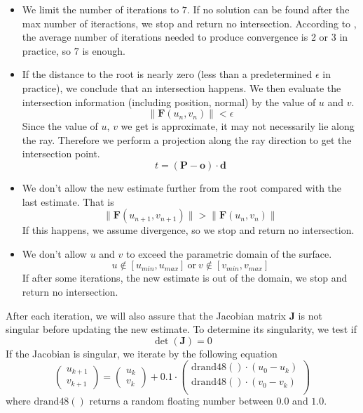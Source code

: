 \documentclass[acmtog]{acmart}
\begin{document}
\begin{itemize}
	\item We limit the number of iterations to $7$. If no solution can be found after the max number of iteractions, we stop and return no intersection. According to \cite{}, the average number of iterations needed to produce convergence is 2 or 3 in practice, so $7$ is enough.
	
	\item If the distance to the root is nearly zero (less than a predetermined $\epsilon$ in practice), we conclude that an intersection happens. We then evaluate the intersection information (including position, normal) by the value of $u$ and $v$.
	\[
		\| \mathbf{F}(u_n, v_n) \| < \epsilon	
	\]
	Since the value of $u$, $v$ we get is approximate, it may not necessarily lie along the ray. Therefore we perform a projection along the ray direction to get the intersection point. \[
		t = (\mathbf{P} - \mathbf{o}) \cdot \mathbf{d}	
	\]

	\item We don't allow the new estimate further from the root compared with the last estimate. That is \[
		\| \mathbf{F}(u_{n+1}, v_{n+1}) \| >
		\| \mathbf{F}(u_{n}, v_{n}) \|
	\] 
	If this happens, we assume divergence, so we stop and return no intersection.

	\item We don't allow $u$ and $v$ to exceed the parametric domain of the surface. \[
		u \notin [u_{min}, u_{max}] \mathrm{\ or\ } v \notin [v_{min}, v_{max}]	
	\]
	If after some iterations, the new estimate is out of the domain, we stop and return no intersection.
\end{itemize}

After each iteration, we will also assure that the Jacobian matrix $\mathbf{J}$ is not singular before updating the new estimate. To determine its singularity, we test if \[
	\det(\mathbf{J}) = 0	
\]
If the Jacobian is singular, we iterate by the following equation
\[
	\left(\begin{matrix}
		u_{k+1}\\v_{k+1}
	\end{matrix}\right)	= 
	\left(\begin{matrix}
		u_{k}\\v_{k}
	\end{matrix}\right) + 0.1 \cdot \left(\begin{matrix}
		\mathrm{drand48}() \cdot (u_0 - u_k)\\
		\mathrm{drand48}() \cdot (v_0 - v_k)\\
	\end{matrix}\right)
\] where $\mathrm{drand48()}$ returns a random floating number between $0.0$ and $1.0$.
\end{document}
